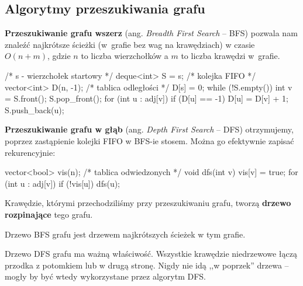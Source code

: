 \subsection{Algorytmy przeszukiwania grafu}

\textbf{Przeszukiwanie grafu wszerz} (ang. \textit{Breadth First Search} -- BFS) pozwala nam znaleźć 
najkrótsze ścieżki (w~grafie bez wag na krawędziach) w czasie $O(n + m)$, gdzie $n$ to liczba wierzchołków a $m$ to 
liczba krawędzi w~grafie.

\begin{cpp}
/* s - wierzchołek startowy */
deque<int> S = {s}; /* kolejka FIFO */
vector<int> D(n, -1); /* tablica odległości */
D[s] = 0;
while (!S.empty()) {
    int v = S.front();
    S.pop_front();
    for (int u : adj[v]) {
        if (D[u] == -1) {
            D[u] = D[v] + 1;
            S.push_back(u);
        }
    }
}
\end{cpp}

\textbf{Przeszukiwanie grafu w głąb} (ang. \textit{Depth First Search} -- DFS) otrzymujemy, poprzez zastąpienie kolejki FIFO w BFS-ie stosem. 
Można go efektywnie zapisać rekurencyjnie:
\begin{cpp}
vector<bool> vis(n); /* tablica odwiedzonych */
void dfs(int v) {
    vis[v] = true;
    for (int u : adj[v]) {
        if (!vis[u])
            dfs(u);
    }
}
\end{cpp}

Krawędzie, którymi przechodziliśmy przy przeszukiwaniu grafu, tworzą \textbf{drzewo rozpinające} tego grafu. 

Drzewo BFS grafu jest drzewem najkrótszych ścieżek w tym grafie.

Drzewo DFS grafu ma ważną właściwość. Wszystkie krawędzie niedrzewowe łączą przodka z potomkiem lub w drugą stronę. Nigdy nie idą ,,w poprzek'' drzewa -- mogły by być wtedy wykorzystane przez algorytm DFS.

